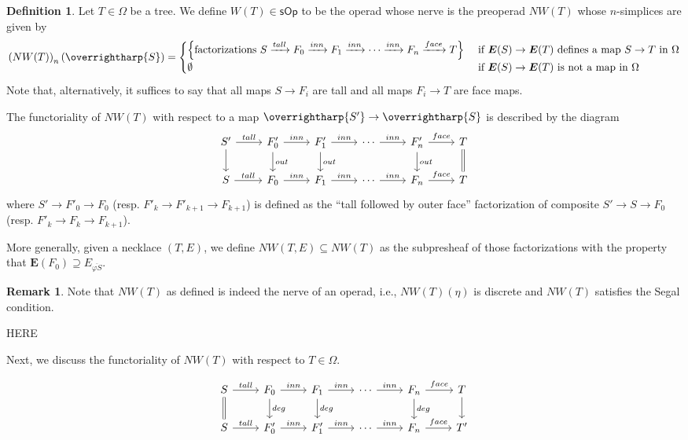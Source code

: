 \documentclass[a4paper,10pt
,draft
]{article}%
\numberwithin{equation}{section}
\numberwithin{figure}{section}
\theoremstyle{definition} %
\newtheorem{definition}[equation]{Definition}%
\newtheorem{remark}[equation]{Remark}%
\newcommand{\vect}[1]{\text{\overrightharp{\ensuremath{#1}}}}
\newcommand{\1}{\ensuremath{\mathbbm 1}}%
\begin{document}
\begin{definition}
	Let $T \in \Omega$ be a tree.
	We define 
	$W(T) \in \mathsf{sOp}$
	to be the operad whose nerve is the preoperad
	$NW(T)$ whose $n$-simplices are given by
\[
	\left(NW(T)\right)_n(\vect{S})
=
\begin{cases}
	\left\{
	\text{factorizations }
	S \xrightarrow{tall} 
	F_0 \xrightarrow{inn} 
	F_1 \xrightarrow{inn} 
	\cdots \xrightarrow{inn}
	F_n \xrightarrow{face}
	T
	\right\}
&
	\text{ if } 
	\boldsymbol{E}(S) \to \boldsymbol{E}(T)
	\text{ defines a map } S \to T \text{ in } \Omega
\\
	\emptyset 
& \text{ if } 
	\boldsymbol{E}(S) \to \boldsymbol{E}(T)
	\text{ is not a map in } \Omega
\end{cases}
\]
Note that, alternatively, it suffices to say that all maps
$S \to F_i$ are tall
and all maps $F_i \to T$ are face maps.

The functoriality of 
$NW(T)$
with respect to a map $\vect{S'} \to \vect{S}$
is described by the diagram
\[
\begin{tikzcd}
	S' \ar{r}{tall} \ar{d}
&
	F'_0 \ar{r}{inn} \ar{d}{out}
&
	F'_1 \ar{r}{inn} \ar{d}{out}
&
	\cdots \ar{r}{inn}
&
	F'_n \ar{r}{face} \ar{d}{out}
&
	T \ar[equal]{d}
\\
	S \ar{r}{tall} 
&
	F_0 \ar{r}{inn}
&
	F_1 \ar{r}{inn}
&
	\cdots \ar{r}{inn}
&
	F_n \ar{r}{face}
&
	T	
\end{tikzcd}
\]
where 
$S' \to F'_0 \to F_0$
(resp. $F'_k \to F'_{k+1} \to F_{k+1}$)
is defined as the ``tall followed by outer face''
factorization of composite
$S' \to S \to F_0$
(resp. $F'_k \to F_{k} \to F_{k+1}$).


More generally, 
given a necklace $(T,E)$,
we define
$NW(T,E) \subseteq NW(T)$
as the subpresheaf
of those factorizations with the property that
$\boldsymbol{E}(F_0) \supseteq E_{\overline{\varphi S}}$.
\end{definition}


\begin{remark}
	Note that 
	$NW(T)$ as defined is indeed the nerve of an operad, i.e., 
	$NW(T)(\eta)$ is discrete
	and
	$NW(T)$ satisfies the Segal condition.
\end{remark}


{\color{red} HERE}



Next, we discuss the functoriality of
$NW(T)$ with respect to $T \in \Omega$.


\[
\begin{tikzcd}
	S \ar{r}{tall} \ar[equal]{d}
&
	F_0 \ar{r}{inn} \ar{d}{deg}
&
	F_1 \ar{r}{inn} \ar{d}{deg}
&
	\cdots \ar{r}{inn}
&
	F_n \ar{r}{face} \ar{d}{deg}
&
	T \ar{d}
\\
	S \ar{r}{tall} 
&
	F'_0 \ar{r}{inn}
&
	F'_1 \ar{r}{inn}
&
	\cdots \ar{r}{inn}
&
	F_n \ar{r}{face}
&
	T'
\end{tikzcd}
\]
\end{document}
